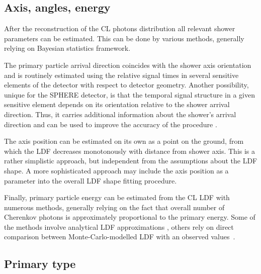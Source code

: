 \documentclass[a4paper,11pt]{article}
\begin{document}

\subsection{Axis, angles, energy}

After the reconstruction of the CL photons distribution all relevant shower parameters can be estimated. This can be done by various methods, generally relying on Bayesian statistics framework.

The primary particle arrival direction coincides with the shower axis orientation and is routinely estimated using the relative signal times in several sensitive elements of the detector with respect to detector geometry. Another possibility, unique for the SPHERE detector, is that the temporal signal structure in a given sensitive element depends on its orientation relative to the shower arrival direction. Thus, it carries additional information about the shower's arrival direction and can be used to improve the accuracy of the procedure \cite{Antonov2020}.

The axis position can be estimated on its own as a point on the ground, from which the LDF decreases monotonously with distance from shower axis. This is a rather simplistic approach, but independent from the assumptions about the LDF shape. A more sophisticated approach may include the axis position as a parameter into the overall LDF shape fitting procedure.

Finally, primary particle energy can be estimated from the CL LDF with numerous methods, generally relying on the fact that overall number of Cherenkov photons is approximately proportional to the primary energy. Some of the methods involve analytical LDF approximations \cite[e.g.][]{AlRubaiee2014}, others rely on direct comparison between Monte-Carlo-modelled LDF with an observed values~\cite{Antonov2015}.

\subsection{Primary type}
\end{document}
